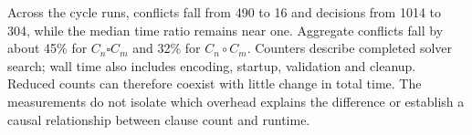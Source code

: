 \begin{table}[htbp]
\centering\small
\caption{Search counters in complete symmetry-run pairs.}
\label{tab:compact-counters}

\end{table}

Across the cycle runs, conflicts fall from 490 to 16 and decisions from
1014 to 304, while the median time ratio remains near one.
Aggregate conflicts fall by about 45\% for $C_n\square C_m$ and 32\%
for $C_n\circ C_m$. Counters describe completed solver search;
wall time also includes encoding, startup, validation and cleanup.
Reduced counts can therefore coexist with little change in total time.
The measurements do not isolate which overhead explains the difference
or establish a causal relationship between clause count and runtime.
